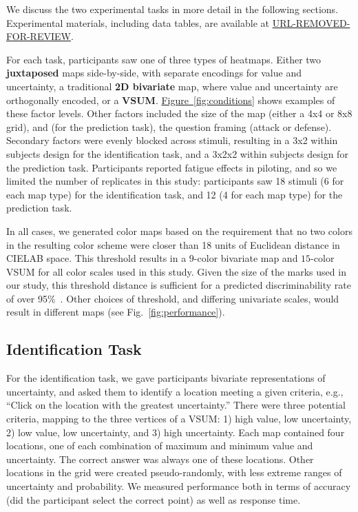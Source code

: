 \documentclass{vgtc}                          %
\newcommand{\figref}[1]{\hyperref[#1]{Figure~\ref*{#1}}}
\begin{document}
We discuss the two experimental tasks in more detail in the following sections. Experimental materials, including data tables, are available at \url{URL-REMOVED-FOR-REVIEW}.

For each task, participants saw one of three types of heatmaps. Either two \textbf{juxtaposed} maps side-by-side, with separate encodings for value and uncertainty, a traditional \textbf{2D bivariate} map, where value and uncertainty are orthogonally encoded, or a \textbf{VSUM}. \figref{fig:conditions} shows examples of these factor levels. Other factors included the size of the map (either a 4x4 or 8x8 grid), and (for the prediction task), the question framing (attack or defense). Secondary factors were evenly blocked across stimuli, resulting in a 3x2 within subjects design for the identification task, and a 3x2x2 within subjects design for the prediction task. Participants reported fatigue effects in piloting, and so we limited the number of replicates in this study: participants saw 18 stimuli (6 for each map type) for the identification task, and 12 (4 for each map type) for the prediction task. 

In all cases, we generated color maps based on the requirement that no two colors in the resulting color scheme were closer than 18 units of Euclidean distance in CIELAB space. This threshold results in a $9$-color bivariate map and $15$-color VSUM for all color scales used in this study. Given the size of the marks used in our study, this threshold distance is sufficient for a predicted discriminability rate of over 95\%~\cite{stone2014engineering}. Other choices of threshold, and differing univariate scales, would result in different maps (see Fig.~\ref{fig:performance}).


\subsection{Identification Task}

For the identification task, we gave participants bivariate representations of uncertainty, and asked them to identify a location meeting a given criteria, e.g., ``Click on the location with the greatest uncertainty.'' There were three potential criteria, mapping to the three vertices of a VSUM: 1) high value, low uncertainty, 2) low value, low uncertainty, and 3) high uncertainty. Each map contained four locations, one of each combination of maximum and minimum value and uncertainty. The correct answer was always one of these locations. Other locations in the grid were created pseudo-randomly, with less extreme ranges of uncertainty and probability. We measured performance both in terms of accuracy (did the participant select the correct point) as well as response time.
\end{document}
